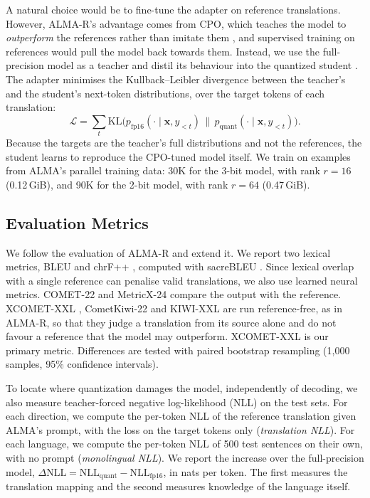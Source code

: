 \documentclass[10pt]{article}
\begin{document}
A natural choice would be to fine-tune the adapter on reference translations.
However, ALMA-R's advantage comes from CPO, which teaches the model to
\emph{outperform} the references rather than imitate them \citep{xu2024cpo}, and
supervised training on references would pull the model back towards them.
Instead, we use the full-precision model as a teacher and distil its behaviour
into the quantized student \citep{hinton2015distilling,kim2016sequence}. The
adapter minimises the Kullback--Leibler divergence
\citep{kullback1951information} between the teacher's and the student's
next-token distributions, over the target tokens of each translation:
\begin{equation}
  \mathcal{L} = \sum_{t}
  \mathrm{KL}\big( p_{\text{fp16}}(\cdot \mid \mathbf{x}, y_{<t})
  \,\|\, p_{\text{quant}}(\cdot \mid \mathbf{x}, y_{<t}) \big).
\end{equation}
Because the targets are the teacher's full distributions and not the references,
the student learns to reproduce the CPO-tuned model itself. We train on
examples from ALMA's parallel training data: 30K for the 3-bit model, with rank
$r=16$ (0.12\,GiB), and 90K for the 2-bit model, with rank $r=64$ (0.47\,GiB).


\subsection{Evaluation Metrics}
We follow the evaluation of ALMA-R \citep{xu2024cpo} and extend it. We report
two lexical metrics, BLEU \citep{papineni2002bleu} and chrF++
\citep{popovic2017chrf}, computed with sacreBLEU \citep{post2018sacrebleu}. Since
lexical overlap with a single reference can penalise valid translations, we also
use learned neural metrics. COMET-22 \citep{rei2022comet22} and MetricX-24
\citep{juraska2024metricx} compare the output with the reference. XCOMET-XXL
\citep{guerreiro2024xcomet}, CometKiwi-22 \citep{rei2022cometkiwi} and
KIWI-XXL \citep{rei2023scaling} are run reference-free, as in ALMA-R, so that
they judge a translation from its source alone and do not favour a reference
that the model may outperform. XCOMET-XXL is our primary metric. Differences are
tested with paired bootstrap resampling (1{,}000 samples, 95\% confidence
intervals).

To locate where quantization damages the model, independently of decoding, we
also measure teacher-forced negative log-likelihood (NLL) on the test sets. For
each direction, we compute the per-token NLL of the reference translation given
ALMA's prompt, with the loss on the target tokens only (\emph{translation NLL}).
For each language, we compute the per-token NLL of 500 test sentences on their
own, with no prompt (\emph{monolingual NLL}). We report the increase over the
full-precision model, $\Delta\mathrm{NLL} = \mathrm{NLL}_{\text{quant}} -
\mathrm{NLL}_{\text{fp16}}$, in nats per token. The first measures the
translation mapping and the second measures knowledge of the language itself.
\end{document}
